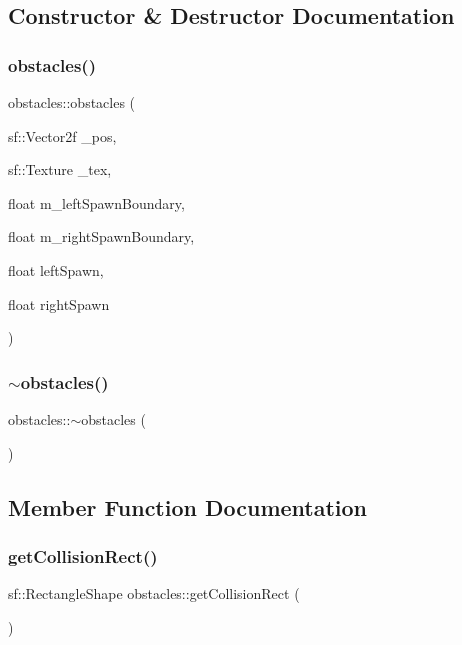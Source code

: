 \subsection{Constructor \& Destructor Documentation}
\mbox{\label{classobstacles_a73a39047ba35127248a8753926e05a06}} 
\subsubsection{\texorpdfstring{obstacles()}{obstacles()}}
{\footnotesize\ttfamily obstacles\+::obstacles (\begin{DoxyParamCaption}\item[{sf\+::\+Vector2f}]{\+\_\+pos,  }\item[{sf\+::\+Texture}]{\+\_\+tex,  }\item[{float}]{m\+\_\+left\+Spawn\+Boundary,  }\item[{float}]{m\+\_\+right\+Spawn\+Boundary,  }\item[{float}]{left\+Spawn,  }\item[{float}]{right\+Spawn }\end{DoxyParamCaption})}

\mbox{\label{classobstacles_a7170fd3da6a296dd4690451bcd2627c5}} 
\subsubsection{\texorpdfstring{$\sim$obstacles()}{~obstacles()}}
{\footnotesize\ttfamily obstacles\+::$\sim$obstacles (\begin{DoxyParamCaption}{ }\end{DoxyParamCaption})}



\subsection{Member Function Documentation}
\mbox{\label{classobstacles_a5946a8ff28012b4b6b1a21c68fdd0655}} 
\subsubsection{\texorpdfstring{get\+Collision\+Rect()}{getCollisionRect()}}
{\footnotesize\ttfamily sf\+::\+Rectangle\+Shape obstacles\+::get\+Collision\+Rect (\begin{DoxyParamCaption}{ }\end{DoxyParamCaption})}

